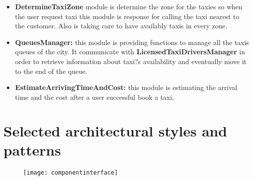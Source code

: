 \documentclass[12pt, oneside]{book}   	%
\begin{document}
\begin{itemize}
\item \textbf{DetermineTaxiZone }module is determine the zone for the taxies so when the user request taxi 
this module is response for calling the taxi nearest to the customer. Also is taking care to have availably taxis in every zone.
\item \textbf{QueuesManager: }this module is providing functions to manage all the taxis queues of the city. It communicate with \textbf{LicensedTaxiDriversManager} in order to retrieve information about taxi?s availability and eventually move it to the end of the queue.
\item \textbf{EstimateArrivingTimeAndCost: }this module is estimating the arrival time and the cost after a user successful book a taxi. 
\end{itemize}
\clearpage
\section{Selected architectural styles and patterns}
\begin{figure}[h]
\center \texttt{[image: componentinterface]}
\end{figure}
\end{document}
